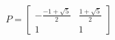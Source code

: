 \documentclass[preview]{standalone}
\begin{document}
\begin{center}
$$P = \begin{bmatrix} - \frac{-1 + \sqrt{5}}{2} &  \frac{1 + \sqrt{5}}{2} \\ 1 & 1 \end{bmatrix}$$
\end{center}
\end{document}
